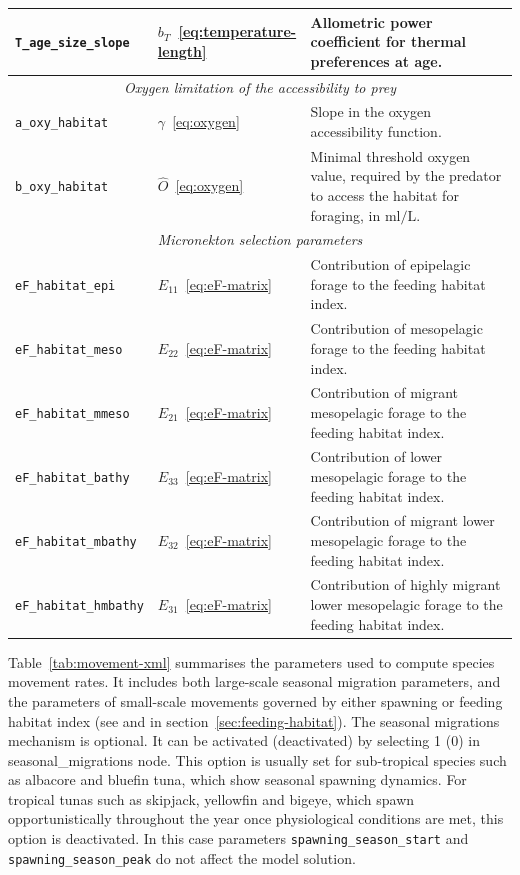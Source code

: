 \begin{longtable}{p{3.75cm}p{1.75cm}p{9.75cm}}
    \texttt{T\_age\_size\_slope} & $b_T$~\eqref{eq:temperature-length} & {Allometric power coefficient for thermal preferences at age.} \\
   \hline
   \multicolumn{3}{c}{\textit{ Oxygen limitation of the accessibility to prey}}\\
   \hline
    \texttt{a\_oxy\_habitat} & $\gamma$~\eqref{eq:oxygen} & {Slope in the oxygen accessibility function.}\\
    
    \texttt{b\_oxy\_habitat} & $\hat{O}$~\eqref{eq:oxygen} & {Minimal threshold oxygen value, required by the predator to access the habitat for foraging, in $\text{ml}/\text{L}$.}\\
   \hline
   \multicolumn{3}{c}{\textit{ Micronekton selection parameters}}\\    
   \hline
    \texttt{eF\_habitat\_epi} & $E_{11}$~\eqref{eq:eF-matrix} & Contribution of epipelagic forage to the feeding habitat index.\\
    \texttt{eF\_habitat\_meso} & $E_{22}$~\eqref{eq:eF-matrix} & Contribution of mesopelagic forage to the feeding habitat index. \\
    \texttt{eF\_habitat\_mmeso} & $E_{21}$~\eqref{eq:eF-matrix} & Contribution of migrant mesopelagic forage to the feeding habitat index. \\
    \texttt{eF\_habitat\_bathy} & $E_{33}$~\eqref{eq:eF-matrix} & Contribution of lower mesopelagic forage to the feeding habitat index. \\
    \texttt{eF\_habitat\_mbathy} & $E_{32}$~\eqref{eq:eF-matrix} & Contribution of migrant lower mesopelagic forage to the feeding habitat index. \\
    \texttt{eF\_habitat\_hmbathy} & $E_{31}$~\eqref{eq:eF-matrix} & Contribution of highly migrant lower mesopelagic forage to the feeding habitat index. \\
    \hline  
\end{longtable}

Table~\ref{tab:movement-xml} summarises the parameters used to compute species movement rates. It includes both large-scale seasonal migration parameters, and the parameters of small-scale movements governed by either spawning or feeding habitat index (see  and  in section~\ref{sec:feeding-habitat}). The seasonal migrations mechanism is optional. It can be activated (deactivated) by selecting 1 (0) in {\ttfamily seasonal\_migrations} node. This option is usually set for sub-tropical species such as albacore and bluefin tuna, which show seasonal spawning dynamics. For tropical tunas such as skipjack, yellowfin and bigeye, which spawn opportunistically throughout the year once physiological conditions are met, this option is deactivated. In this case parameters \texttt{spawning\_season\_start} and \texttt{spawning\_season\_peak} do not affect the model solution. 

